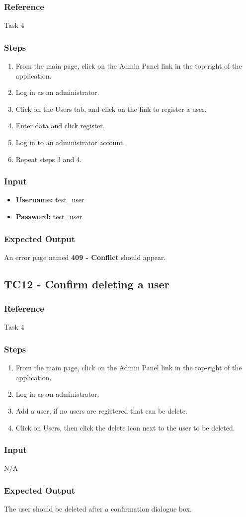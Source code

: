 \subsubsection{Reference}

Task 4

\subsubsection{Steps}
\begin{enumerate}
			\item From the main page, click on the Admin Panel link in the top-right of the application.
	\item Log in as an administrator.
	\item Click on the Users tab, and click on the link to register a user.
	\item Enter data and click register.
	\item Log in to an administrator account.
	\item Repeat steps 3 and 4.
\end{enumerate}	
\subsubsection{Input}
\begin{itemize}
\item \textbf{Username: } test\_user
\item \textbf{Password: } test\_user	
\end{itemize}
\subsubsection{Expected Output}
An error page named \textbf{409 - Conflict} should appear.
\subsection{TC12 - Confirm deleting a user}

\subsubsection{Reference}

Task 4

\subsubsection{Steps}
\begin{enumerate}
			\item From the main page, click on the Admin Panel link in the top-right of the application.
	\item Log in as an administrator.
	\item Add a user, if no users are registered that can be delete.
	\item Click on Users, then click the delete icon next to the user to be deleted.
\end{enumerate}	
\subsubsection{Input}
N/A
\subsubsection{Expected Output}
The user should be deleted after a confirmation dialogue box.
